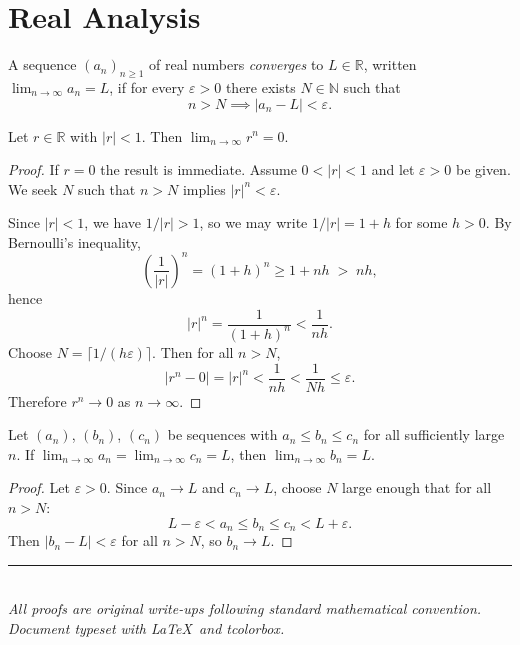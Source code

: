 \section{Real Analysis}

\begin{Definition}
A sequence $(a_n)_{n \geq 1}$ of real numbers \emph{converges} to $L \in
\mathbb{R}$, written $\lim_{n\to\infty} a_n = L$, if for every
$\varepsilon > 0$ there exists $N \in \mathbb{N}$ such that
\[
  n > N \implies |a_n - L| < \varepsilon.
\]
\end{Definition}

\vspace{6pt}

\begin{Proposition}
Let $r \in \mathbb{R}$ with $|r| < 1$. Then $\displaystyle\lim_{n \to \infty} r^n = 0$.
\end{Proposition}

\begin{proof}
If $r = 0$ the result is immediate. Assume $0 < |r| < 1$ and let
$\varepsilon > 0$ be given. We seek $N$ such that $n > N$ implies
$|r|^n < \varepsilon$.

Since $|r| < 1$, we have $1/|r| > 1$, so we may write $1/|r| = 1 + h$
for some $h > 0$. By Bernoulli's inequality,
\[
  \left(\frac{1}{|r|}\right)^{\!n} = (1+h)^n \geq 1 + nh \;>\; nh,
\]
hence
\[
  |r|^n = \frac{1}{(1+h)^n} < \frac{1}{nh}.
\]
Choose $N = \lceil 1/(h\varepsilon) \rceil$. Then for all $n > N$,
\[
  |r^n - 0| = |r|^n < \frac{1}{nh} < \frac{1}{Nh} \leq \varepsilon.
\]
Therefore $r^n \to 0$ as $n \to \infty$.
\end{proof}

\vspace{6pt}

\begin{Lemma}
Let $(a_n)$, $(b_n)$, $(c_n)$ be sequences with $a_n \leq b_n \leq c_n$
for all sufficiently large $n$. If
$\lim_{n\to\infty} a_n = \lim_{n\to\infty} c_n = L$, then
$\lim_{n\to\infty} b_n = L$.
\end{Lemma}

\begin{proof}
Let $\varepsilon > 0$. Since $a_n \to L$ and $c_n \to L$, choose $N$
large enough that for all $n > N$:
\[
  L - \varepsilon < a_n \leq b_n \leq c_n < L + \varepsilon.
\]
Then $|b_n - L| < \varepsilon$ for all $n > N$, so $b_n \to L$.
\end{proof}

\vspace{12pt}
\begin{center}
  {\color{rulecol}\rule{0.55\linewidth}{0.5pt}}\\[6pt]
  {\small\color{neutralgray}
    \textit{All proofs are original write-ups following standard mathematical convention.}\\
    \textit{Document typeset with \LaTeX\ and \textsf{tcolorbox}.}}
\end{center}
